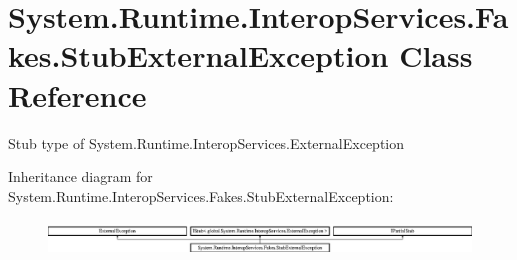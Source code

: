\hypertarget{class_system_1_1_runtime_1_1_interop_services_1_1_fakes_1_1_stub_external_exception}{\section{System.\-Runtime.\-Interop\-Services.\-Fakes.\-Stub\-External\-Exception Class Reference}
\label{class_system_1_1_runtime_1_1_interop_services_1_1_fakes_1_1_stub_external_exception}
}


Stub type of System.\-Runtime.\-Interop\-Services.\-External\-Exception 


Inheritance diagram for System.\-Runtime.\-Interop\-Services.\-Fakes.\-Stub\-External\-Exception\-:\begin{figure}[H]
\begin{center}
\leavevmode
\includegraphics[height=0.942761cm]{class_system_1_1_runtime_1_1_interop_services_1_1_fakes_1_1_stub_external_exception}
\end{center}
\end{figure}
